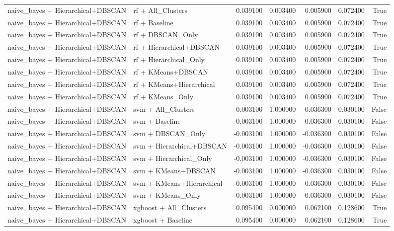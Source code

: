 \begin{tabular}{llrrrrr}
naive_bayes + Hierarchical+DBSCAN & rf + All_Clusters & 0.039100 & 0.003400 & 0.005900 & 0.072400 & True \\
naive_bayes + Hierarchical+DBSCAN & rf + Baseline & 0.039100 & 0.003400 & 0.005900 & 0.072400 & True \\
naive_bayes + Hierarchical+DBSCAN & rf + DBSCAN_Only & 0.039100 & 0.003400 & 0.005900 & 0.072400 & True \\
naive_bayes + Hierarchical+DBSCAN & rf + Hierarchical+DBSCAN & 0.039100 & 0.003400 & 0.005900 & 0.072400 & True \\
naive_bayes + Hierarchical+DBSCAN & rf + Hierarchical_Only & 0.039100 & 0.003400 & 0.005900 & 0.072400 & True \\
naive_bayes + Hierarchical+DBSCAN & rf + KMeans+DBSCAN & 0.039100 & 0.003400 & 0.005900 & 0.072400 & True \\
naive_bayes + Hierarchical+DBSCAN & rf + KMeans+Hierarchical & 0.039100 & 0.003400 & 0.005900 & 0.072400 & True \\
naive_bayes + Hierarchical+DBSCAN & rf + KMeans_Only & 0.039100 & 0.003400 & 0.005900 & 0.072400 & True \\
naive_bayes + Hierarchical+DBSCAN & svm + All_Clusters & -0.003100 & 1.000000 & -0.036300 & 0.030100 & False \\
naive_bayes + Hierarchical+DBSCAN & svm + Baseline & -0.003100 & 1.000000 & -0.036300 & 0.030100 & False \\
naive_bayes + Hierarchical+DBSCAN & svm + DBSCAN_Only & -0.003100 & 1.000000 & -0.036300 & 0.030100 & False \\
naive_bayes + Hierarchical+DBSCAN & svm + Hierarchical+DBSCAN & -0.003100 & 1.000000 & -0.036300 & 0.030100 & False \\
naive_bayes + Hierarchical+DBSCAN & svm + Hierarchical_Only & -0.003100 & 1.000000 & -0.036300 & 0.030100 & False \\
naive_bayes + Hierarchical+DBSCAN & svm + KMeans+DBSCAN & -0.003100 & 1.000000 & -0.036300 & 0.030100 & False \\
naive_bayes + Hierarchical+DBSCAN & svm + KMeans+Hierarchical & -0.003100 & 1.000000 & -0.036300 & 0.030100 & False \\
naive_bayes + Hierarchical+DBSCAN & svm + KMeans_Only & -0.003100 & 1.000000 & -0.036300 & 0.030100 & False \\
naive_bayes + Hierarchical+DBSCAN & xgboost + All_Clusters & 0.095400 & 0.000000 & 0.062100 & 0.128600 & True \\
naive_bayes + Hierarchical+DBSCAN & xgboost + Baseline & 0.095400 & 0.000000 & 0.062100 & 0.128600 & True \\

\end{tabular}

